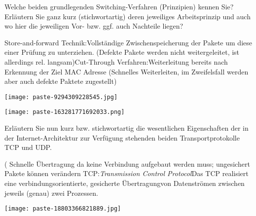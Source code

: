 \documentclass{article}
\begin{document}
\begin{tcolorbox}[colback=white!10!white,colframe=lightgray!75!black,
  savelowerto=\jobname_ex.tex,breakable,enhanced,lines before break=40]

\justifying
Welche beiden grundlegenden Switching-Verfahren (Prinzipien) kennen Sie? Erläutern Sie ganz kurz (stichwortartig) deren jeweiliges Arbeitsprinzip und auch wo hier die jeweiligen Vor- bzw. ggf. auch Nachteile liegen?

\tcblower

\justifying
Store-and-forward Technik:Vollständige Zwischenspeicherung der Pakete um diese einer Prüfung zu unterziehen. (Defekte Pakete werden nicht weitergeleitet, ist allerdings rel. langsam)Cut-Through Verfahren:Weiterleitung bereits nach Erkennung der Ziel MAC Adresse (Schnelles Weiterleiten, im Zweifelsfall werden aber auch defekte Paktete zugestellt)\begin{center}
\texttt{[image: paste-9294309228545.jpg]}
\end{center}
\begin{center}
\texttt{[image: paste-163281771692033.png]}
\end{center}

\end{tcolorbox}
\begin{tcolorbox}[colback=white!10!white,colframe=lightgray!75!black,
  savelowerto=\jobname_ex.tex,breakable,enhanced,lines before break=40]

\justifying
Erläutern Sie nun kurz bzw. stichwortartig die wesentlichen Eigenschaften der in der Internet-Architektur zur Verfügung stehenden beiden Transportprotokolle TCP und UDP.

\tcblower

\justifying
( Schnelle Übertragung  da keine Verbindung aufgebaut werden muss;  ungesichert  Pakete können verändern TCP:\textit{Transmission Control Protocol}Das TCP realisiert eine verbindungsorientierte, gesicherte Übertragungvon Datenströmen zwischen jeweils (genau) zwei Prozessen.\begin{center}
\texttt{[image: paste-18803366821889.jpg]}
\end{center}

\end{tcolorbox}
\end{document}
